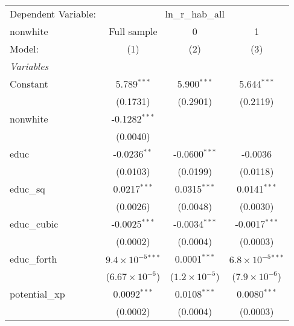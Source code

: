 \begingroup
\centering
\begin{tabular}{lccc}
   \tabularnewline \midrule \midrule
   Dependent Variable: & \multicolumn{3}{c}{ln\_r\_hab\_all}\\
   nonwhite                        & Full sample                  & 0                      & 1 \\   
   Model:                          & (1)                          & (2)                    & (3)\\  
   \midrule
   \emph{Variables}\\
   Constant                        & 5.789$^{***}$                & 5.900$^{***}$          & 5.644$^{***}$\\   
                                   & (0.1731)                     & (0.2901)               & (0.2119)\\   
   nonwhite                        & -0.1282$^{***}$              &                        &   \\   
                                   & (0.0040)                     &                        &   \\   
   educ                            & -0.0236$^{**}$               & -0.0600$^{***}$        & -0.0036\\   
                                   & (0.0103)                     & (0.0199)               & (0.0118)\\   
   educ\_sq                        & 0.0217$^{***}$               & 0.0315$^{***}$         & 0.0141$^{***}$\\   
                                   & (0.0026)                     & (0.0048)               & (0.0030)\\   
   educ\_cubic                     & -0.0025$^{***}$              & -0.0034$^{***}$        & -0.0017$^{***}$\\   
                                   & (0.0002)                     & (0.0004)               & (0.0003)\\   
   educ\_forth                     & $9.4\times 10^{-5}$$^{***}$  & 0.0001$^{***}$         & $6.8\times 10^{-5}$$^{***}$\\    
                                   & ($6.67\times 10^{-6}$)       & ($1.2\times 10^{-5}$)  & ($7.9\times 10^{-6}$)\\    
   potential\_xp                   & 0.0092$^{***}$               & 0.0108$^{***}$         & 0.0080$^{***}$\\   
                                   & (0.0002)                     & (0.0004)               & (0.0003)\\   

\end{tabular}
